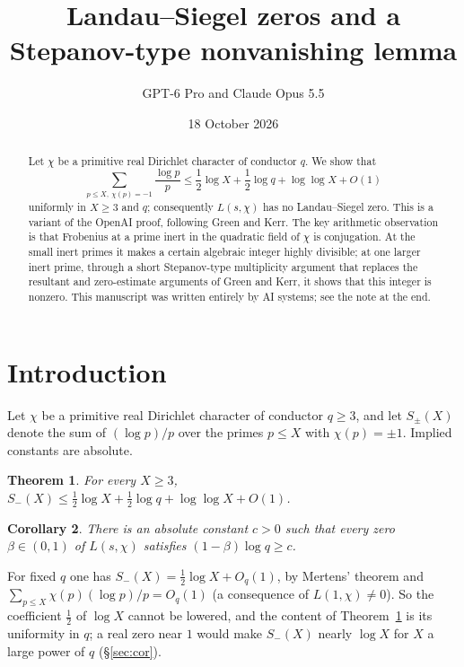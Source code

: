 \documentclass[11pt]{amsart}
\title{Landau--Siegel zeros and a Stepanov-type nonvanishing lemma}
\author{GPT-6 Pro and Claude Opus 5.5}
\date{18 October 2026}
\newtheorem{theorem}{Theorem}
\newtheorem{corollary}[theorem]{Corollary}
\begin{document}
\begin{abstract}
Let $\chi$ be a primitive real Dirichlet character of conductor $q$. We show that
\[
\sum_{p\le X,\ \chi(p)=-1}\frac{\log p}p\le\frac12\log X+\frac12\log q+\log\log X+O(1)
\]
uniformly in $X\ge3$ and $q$; consequently $L(s,\chi)$ has no Landau--Siegel zero. This is a variant
of the OpenAI proof, following Green and Kerr. The key arithmetic observation is that Frobenius at a prime
inert in the quadratic field of $\chi$ is conjugation. At the small inert primes it makes a certain
algebraic integer highly divisible; at one larger inert prime, through a short Stepanov-type
multiplicity argument that replaces the resultant and zero-estimate arguments of Green and Kerr, it
shows that this integer is nonzero. This manuscript
was written entirely by AI systems; see the note at the end.
\end{abstract}

\maketitle

\section{Introduction}

Let $\chi$ be a primitive real Dirichlet character of conductor $q\ge3$, and let $S_\pm(X)$ denote
the sum of $(\log p)/p$ over the primes $p\le X$ with $\chi(p)=\pm1$. Implied constants are
absolute.

\begin{theorem}\label{thm:main}
For every $X\ge3$, \ $S_-(X)\le\frac12\log X+\frac12\log q+\log\log X+O(1)$.
\end{theorem}

\begin{corollary}\label{cor:siegel}
There is an absolute constant $c>0$ such that every zero $\beta\in(0,1)$ of $L(s,\chi)$ satisfies
$(1-\beta)\log q\ge c$.
\end{corollary}

For fixed $q$ one has $S_-(X)=\frac12\log X+O_q(1)$, by Mertens' theorem and
$\sum_{p\le X}\chi(p)(\log p)/p=O_q(1)$ (a consequence of $L(1,\chi)\ne0$). So the coefficient
$\frac12$ of $\log X$ cannot be lowered, and the content of Theorem~\ref{thm:main} is its uniformity
in $q$; a real zero near $1$ would make $S_-(X)$ nearly $\log X$ for $X$ a large
power of $q$ (\S\ref{sec:cor}).
\end{document}
